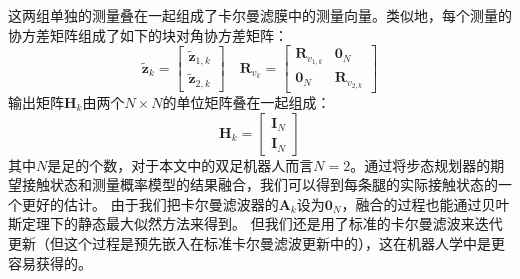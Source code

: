 这两组单独的测量叠在一起组成了卡尔曼滤膜中的测量向量。类似地，每个测量的协方差矩阵组成了如下的块对角协方差矩阵：
\begin{equation}
    \label{equ:est_h_and_f}
    \tilde{\boldsymbol{z}}_k=\left[\begin{array}{c}
        \tilde{\boldsymbol{z}}_{1, k} \\
        \tilde{\boldsymbol{z}}_{2, k}
        \end{array}\right] \quad \boldsymbol{R}_{v_k}=\left[\begin{array}{cc}
        \boldsymbol{R}_{v_{1, k}} & \mathbf{0}_N \\
        \mathbf{0}_N & \boldsymbol{R}_{v_{2, k}}
        \end{array}\right]
\end{equation}
输出矩阵$\boldsymbol{H}_k$由两个$N\times N$的单位矩阵叠在一起组成：
\begin{equation}
    \label{equ:output_matrix}
    \boldsymbol{H}_k=\left[\begin{array}{l}
        \mathbf{I}_N \\
        \mathbf{I}_N
        \end{array}\right]
\end{equation}
其中$N$是足的个数，对于本文中的双足机器人而言$N=2$。通过将步态规划器的期望接触状态和测量概率模型的结果融合，我们可以得到每条腿的实际接触状态的一个更好的估计。
由于我们把卡尔曼滤波器的$\boldsymbol{A}_k$设为$\mathbf{0}_N$，融合的过程也能通过贝叶斯定理下的静态最大似然方法来得到。
但我们还是用了标准的卡尔曼滤波来迭代更新（但这个过程是预先嵌入在标准卡尔曼滤波更新中的），这在机器人学中是更容易获得的。
